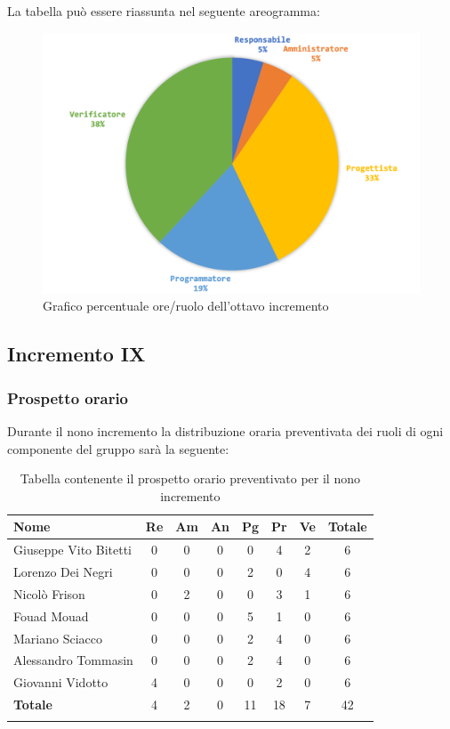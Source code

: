 		La tabella può essere riassunta nel seguente areogramma:
		\begin{figure}[H]
			\centering
			\includegraphics[width=0.8\linewidth]{./images/preventivo/incremento8-2.png}
			\caption{Grafico percentuale ore/ruolo dell'ottavo incremento}
			\label{fig:grafico costi ruolo incremento VIII}
		\end{figure}
		
		
		
	\subsection{Incremento IX}
		\subsubsection{Prospetto orario}
		Durante il nono incremento la distribuzione oraria preventivata dei ruoli di ogni componente del gruppo sarà la seguente:
		
		\begin{longtable}{|l|c|c|c|c|c|c|c|}
			\hline
			\rowcolor{lighter-grayer}
			\textbf{Nome} & \textbf{Re} & \textbf{Am} & \textbf{An} & \textbf{Pg}  & \textbf{Pr}   & \textbf{Ve} & \textbf{Totale} \\
			\hline
			\endfirsthead
			
			\hline
			Giuseppe Vito Bitetti 		 & 0 & 0 & 0 & 0 & 4 & 2 & 6\\
			\hline
			\hline
			Lorenzo Dei Negri			 & 0 & 0 & 0 & 2 & 0 & 4 & 6\\
			\hline
			\hline
			Nicolò Frison				      & 0 & 2 & 0 & 0 & 3 & 1 & 6\\
			\hline
			\hline
			Fouad Mouad 				   & 0 & 0 & 0 & 5 & 1 & 0 & 6\\
			\hline
			\hline
			Mariano Sciacco 			 & 0 & 0 & 0 & 2 & 4 & 0 & 6\\
			\hline
			\hline
			Alessandro Tommasin    & 0 & 0 & 0 & 2 & 4 & 0 & 6\\
			\hline
			\hline
			Giovanni Vidotto 			  & 4 & 0 & 0 & 0 & 2 & 0 & 6\\
			\hline 
			\textbf{Totale}			 		& 4 & 2 & 0 & 11 & 18 & 7 & 42\\
			\hline
			\caption{Tabella contenente il prospetto orario preventivato per il nono incremento}
		\end{longtable}
		\pagebreak
		
